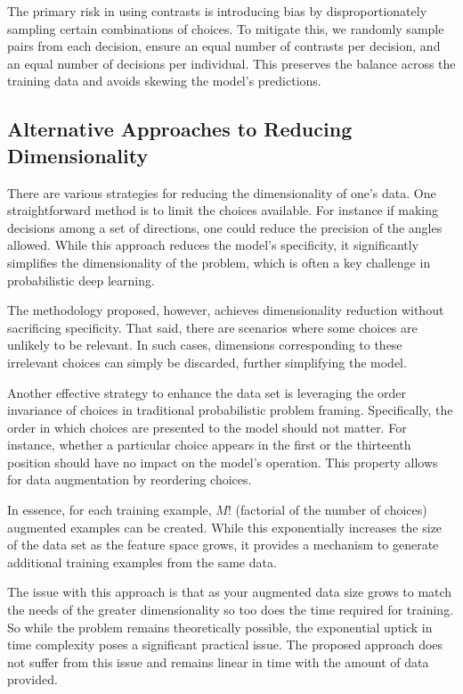 \documentclass[11pt]{article}
\begin{document}
The primary risk in using contrasts is introducing bias by disproportionately sampling certain combinations of choices. To mitigate this, we randomly sample pairs from each decision, ensure an equal number of contrasts per decision, and an equal number of decisions per individual. This preserves the balance across the training data and avoids skewing the model's predictions.

\subsection*{Alternative Approaches to Reducing Dimensionality}
There are various strategies for reducing the dimensionality of one's data. One straightforward method is to limit the choices available. For instance if making decisions among a set of directions, one could reduce the precision of the angles allowed. While this approach reduces the model's specificity, it significantly simplifies the dimensionality of the problem, which is often a key challenge in probabilistic deep learning.

The methodology proposed, however, achieves dimensionality reduction without sacrificing specificity. That said, there are scenarios where some choices are unlikely to be relevant. In such cases, dimensions corresponding to these irrelevant choices can simply be discarded, further simplifying the model. \newline

Another effective strategy to enhance the data set is leveraging the order invariance of choices in traditional probabilistic problem framing. Specifically, the order in which choices are presented to the model should not matter. For instance, whether a particular choice appears in the first or the thirteenth position should have no impact on the model's operation. This property allows for data augmentation by reordering choices.

In essence, for each training example, $M!$ (factorial of the number of choices) augmented examples can be created. While this exponentially increases the size of the data set as the feature space grows, it provides a mechanism to generate additional training examples from the same data.

The issue with this approach is that as your augmented data size grows to match the needs of the greater dimensionality so too does the time required for training. So while the problem remains theoretically possible, the exponential uptick in time complexity poses a significant practical issue. The proposed approach does not suffer from this issue and remains linear in time with the amount of data provided. 
\end{document}
